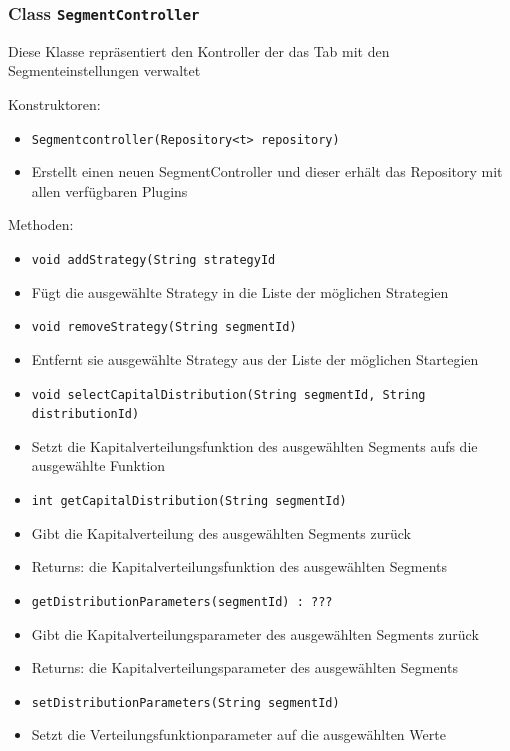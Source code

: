 \documentclass[parskip=full,11pt]{scrartcl}
\begin{document}
\subsubsection{Class \texttt{SegmentController}}
Diese Klasse repräsentiert den Kontroller der das Tab mit den Segmenteinstellungen verwaltet

Konstruktoren:
\begin{itemize}\itemsep -10pt
\item \texttt{Segmentcontroller(Repository<t> repository)}
\item[] Erstellt einen neuen SegmentController und dieser erhält das Repository mit allen verfügbaren Plugins
\end{itemize}

Methoden:
\begin{itemize}\itemsep -10pt
\item \texttt{void addStrategy(String strategyId}
\item[] Fügt die ausgewählte Strategy in die Liste der möglichen Strategien

\item \texttt{void removeStrategy(String segmentId)}
\item[] Entfernt sie ausgewählte Strategy aus der Liste der möglichen Startegien

\item \texttt{void selectCapitalDistribution(String segmentId, String distributionId)}
\item[] Setzt die Kapitalverteilungsfunktion des ausgewählten Segments aufs die ausgewählte Funktion

\item \texttt{int getCapitalDistribution(String segmentId)}
\item[] Gibt die Kapitalverteilung des ausgewählten Segments zurück
\item[] Returns: die Kapitalverteilungsfunktion des ausgewählten Segments

\item \texttt{getDistributionParameters(segmentId) : ???}
\item[] Gibt die Kapitalverteilungsparameter des ausgewählten Segments zurück
\item[] Returns: die Kapitalverteilungsparameter des ausgewählten Segments

\item \texttt{setDistributionParameters(String segmentId)}
\item[] Setzt die Verteilungsfunktionparameter auf die ausgewählten Werte


\end{itemize}
\end{document}
